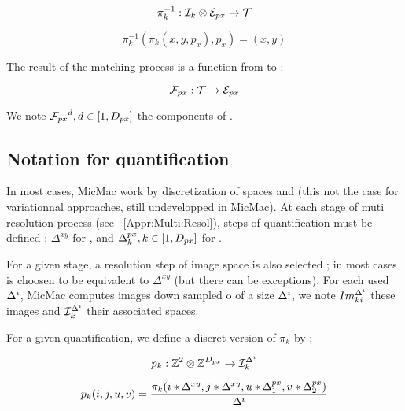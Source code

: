 \begin{equation}
   \pi_k^{-1} :   \EIm \otimes \EPx \rightarrow \ETer
\end{equation}

\begin{equation}
   \pi_k^{-1}(\pi_k(x,y,p_x),p_x) = (x,y) 
\end{equation}


The result of the matching process is a function \FPx from
\ETer to \EPx:

\begin{equation}
   \FPx :   \ETer  \rightarrow  \EPx 
\end{equation}

We note ${\FPx}^d,d\in [1,\DimPx]$ the components of \FPx.


\subsection{Notation for quantification}

\label{Disc:Quant}


In most cases, MicMac work by discretization of
spaces \ETer and \EPx (this not the case for 
variationnal approaches, still undevelopped in MicMac).
At each stage of muti resolution process (see ~\ref{Appr:Multi:Resol}),
steps  of quantification must be defined  : $\Delta^{xy}$ for \ETer ,
and $\Delta^{px}_k, k \in [1,\DimPx]$ for  \EPx.



For a given stage, a resolution  step \DeltaI of image space
is also selected ; in most cases  \DeltaI is choosen to be equivalent
to $\Delta^{xy}$ (but there can be exceptions).
For each used $\DeltaI$, MicMac computes  images down sampled o
of a size $\DeltaI$, we note $Im_{ki}^{\DeltaI}$  these images
and $\EIm^{\DeltaI}$  their associated spaces.



For a given quantification, we define a discret  version
of $\pi_k$ by ;


\begin{equation}
   p_k : \ZZ^2 \otimes\ZZ^{\DimPx} \rightarrow \EIm^{\DeltaI}
\end{equation}

\begin{equation}
   p_k(i,j,u,v) = \frac{\pi_k(i*\Delta^{xy},j*\Delta^{xy},u*\Delta^{px}_1,v*\Delta^{px}_2)}{\DeltaI}
\label{EQ:Disc:Proj}
\end{equation}

